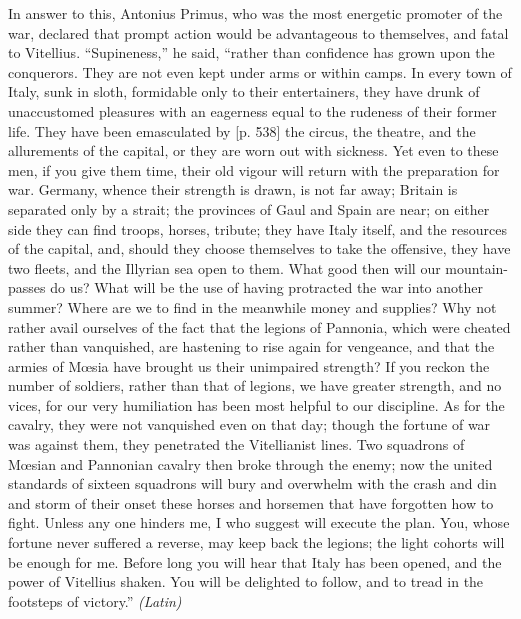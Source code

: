 
In answer to this, Antonius Primus, who was the most energetic promoter of the war, declared that prompt action would be advantageous to themselves, and fatal to Vitellius. ``Supineness,'' he said, ``rather than confidence has grown upon the conquerors. They are not even kept under arms or within camps. In every town of Italy, sunk in sloth, formidable only to their entertainers, they have drunk of unaccustomed pleasures with an eagerness equal to the rudeness of their former life. They have been emasculated by [p. 538] the circus, the theatre, and the allurements of the capital, or they are worn out with sickness. Yet even to these men, if you give them time, their old vigour will return with the preparation for war. Germany, whence their strength is drawn, is not far away; Britain is separated only by a strait; the provinces of Gaul and Spain are near; on either side they can find troops, horses, tribute; they have Italy itself, and the resources of the capital, and, should they choose themselves to take the offensive, they have two fleets, and the Illyrian sea open to them. What good then will our mountain-passes do us? What will be the use of having protracted the war into another summer? Where are we to find in the meanwhile money and supplies? Why not rather avail ourselves of the fact that the legions of Pannonia, which were cheated rather than vanquished, are hastening to rise again for vengeance, and that the armies of Mœsia have brought us their unimpaired strength? If you reckon the number of soldiers, rather than that of legions, we have greater strength, and no vices, for our very humiliation has been most helpful to our discipline. As for the cavalry, they were not vanquished even on that day; though the fortune of war was against them, they penetrated the Vitellianist lines. Two squadrons of Mœsian and Pannonian cavalry then broke through the enemy; now the united standards of sixteen squadrons will bury and overwhelm with the crash and din and storm of their onset these horses and horsemen that have forgotten how to fight. Unless any one hinders me, I who suggest will execute the plan. You, whose fortune never suffered a reverse, may keep back the legions; the light cohorts will be enough for me. Before long you will hear that Italy has been opened, and the power of Vitellius shaken. You will be delighted to follow, and to tread in the footsteps of victory.'' \emph{(Latin)}


